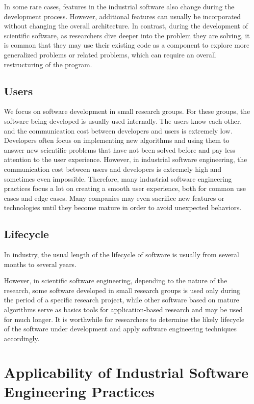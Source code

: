 In some rare cases, features in the industrial software also change during the development process.
However, additional features can usually be incorporated without changing the overall architecture.
In contrast, during the development of scientific software, as researchers dive deeper into the problem they are solving, it is common that they may use their existing code as a component to explore more generalized problems or related problems, which can require an overall restructuring of the program.

\subsection{Users}
We focus on software development in small research groups.
For these groups, the software being developed is usually used internally.
The users know each other, and the communication cost between developers and users is extremely low.
Developers often focus on implementing new algorithms and using them to answer new scientific problems that have not been solved before and pay less attention to the user experience.
However, in industrial software engineering, the communication cost between users and developers is extremely high and sometimes even impossible.
Therefore, many industrial software engineering practices focus a lot on creating a smooth user experience, both for common use cases and edge cases.
Many companies may even sacrifice new features or technologies until they become mature in order to avoid unexpected behaviors.

\subsection{Lifecycle}

In industry, the usual length of the lifecycle of software is usually from several months to several years.

However, in scientific software engineering, depending to the nature of the research, some software developed in small research groups is used only during the period of a specific research project,
while other software based on mature algorithms serve as basics tools for application-based research and may be used for much longer.
It is worthwhile for researchers to determine the likely lifecycle of the software under development and apply software engineering techniques accordingly.

\section{Applicability of Industrial Software Engineering Practices}

